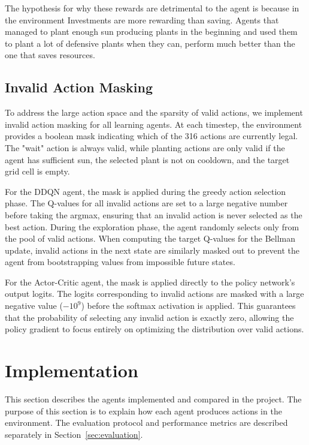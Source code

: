 \documentclass[conference,onecolumn]{IEEEtran}
\begin{document}
The hypothesis for why these rewards are detrimental to the agent is because in the environment Investments are more rewarding than saving. Agents that managed to plant enough sun producing plants in the beginning and used them to plant a lot of defensive plants when they can, perform much better than the one that saves resources.

\subsection{Invalid Action Masking}

To address the large action space and the sparsity of valid actions, we implement invalid action masking for all learning agents. At each timestep, the environment provides a boolean mask indicating which of the 316 actions are currently legal. The "wait" action is always valid, while planting actions are only valid if the agent has sufficient sun, the selected plant is not on cooldown, and the target grid cell is empty.

For the DDQN agent, the mask is applied during the greedy action selection phase. The Q-values for all invalid actions are set to a large negative number before taking the argmax, ensuring that an invalid action is never selected as the best action. During the exploration phase, the agent randomly selects only from the pool of valid actions. When computing the target Q-values for the Bellman update, invalid actions in the next state are similarly masked out to prevent the agent from bootstrapping values from impossible future states.

For the Actor-Critic agent, the mask is applied directly to the policy network's output logits. The logits corresponding to invalid actions are masked with a large negative value ($-10^9$) before the softmax activation is applied. This guarantees that the probability of selecting any invalid action is exactly zero, allowing the policy gradient to focus entirely on optimizing the distribution over valid actions.

\section{Implementation}
\label{sec:implementation}

This section describes the agents implemented and compared in the project. The purpose of this section is to explain how each agent produces actions in the environment. The evaluation protocol and performance metrics are described separately in Section~\ref{sec:evaluation}.
\end{document}
